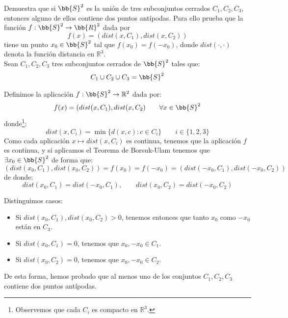 \begin{ejercicio}
    Demuestra que si $\bb{S}^2$ es la unión de tres subconjuntos cerrados $C_1,C_2,C_3$, entonces alguno de ellos contiene dos puntos antípodas. Para ello prueba que la función $f:\bb{S}^2\to \bb{R}^2$ dada por
    \begin{equation*}
        f(x) = (dist(x,C_1), dist(x,C_2))
    \end{equation*}
    tiene un punto $x_0\in \bb{S}^2$ tal que $f(x_0) = f(-x_0)$, donde $dist(\cdot ,\cdot )$ denota la función distancia en $\mathbb{R}^3$.\\

    Sean $C_1,C_2,C_3$ tres subconjuntos cerrados de $\bb{S}^2$ tales que:
    \begin{equation*}
        C_1\cup C_2\cup C_3 = \bb{S}^2
    \end{equation*}

    Definimos la aplicación $f:\bb{S}^2\to \mathbb{R}^2$ dada por:
    \begin{equation*}
        f(x) = (dist(x,C_1), dist(x,C_2) \qquad \forall x\in \bb{S}^2
    \end{equation*}
    donde\footnote{Observemos que cada $C_i$ es compacto en $\mathbb{R}^3$.}:
    \begin{equation*}
        dist(x,C_i) = \min\{d(x,c) : c\in C_i\} \qquad i \in \{1,2,3\}
    \end{equation*}
    Como cada aplicación $x\mapsto dist(x,C_i)$ es continua, tenemos que la aplicación $f$ es continua, y si aplicamos el Teorema de Borsuk-Ulam tenemos que $\exists x_0\in \bb{S}^2$ de forma que:
    \begin{equation*}
        (dist(x_0,C_1),dist(x_0,C_2)) = f(x_0) = f(-x_0)= (dist(-x_0,C_1),dist(-x_0,C_2))
    \end{equation*}
    de donde:
    \begin{equation*}
        dist(x_0,C_1) = dist(-x_0,C_1), \qquad dist(x_0,C_2) = dist(-x_0,C_2)
    \end{equation*}

    Distinguimos casos:
    \begin{itemize}
        \item Si $dist(x_0,C_1), dist(x_0,C_2)>0$, tenemos entonces que tanto $x_0$ como $-x_0$ están en $C_3$.
        \item Si $dist(x_0,C_1) =0$, tenemos que $x_0,-x_0\in C_1$.
        \item Si $dist(x_0,C_2) =0$, tenemos que $x_0,-x_0\in C_2$.
    \end{itemize}

    De esta forma, hemos probado que al menos uno de los conjuntos $C_1,C_2,C_3$ contiene dos puntos antípodas.
\end{ejercicio}

